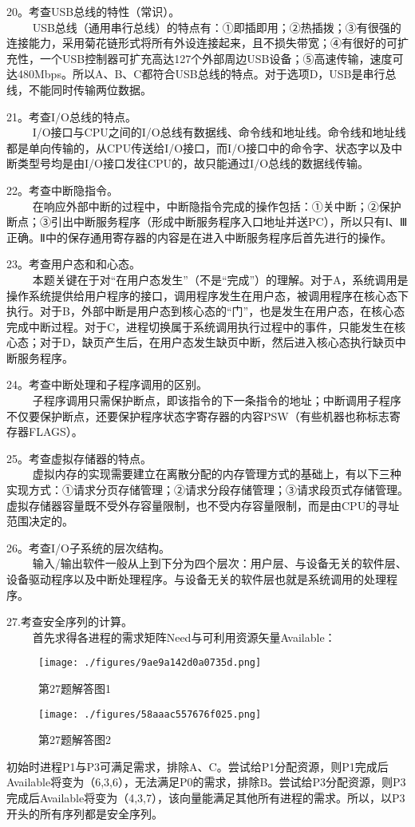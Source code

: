 20。考查USB总线的特性（常识）。\\
$\qquad$ USB总线（通用串行总线）的特点有：①即插即用；②热插拨；③有很强的连接能力，采用菊花链形式将所有外设连接起来，且不损失带宽；④有很好的可扩充性，一个USB控制器可扩充高达127个外部周边USB设备；⑤高速传输，速度可达480Mbps。所以A、B、C都符合USB总线的特点。对于选项D，USB是串行总线，不能同时传输两位数据。

21。考查I/O总线的特点。\\
$\qquad$ I/O接口与CPU之间的I/O总线有数据线、命令线和地址线。命令线和地址线都是单向传输的，从CPU传送给I/O接口，而I/O接口中的命令字、状态字以及中断类型号均是由I/O接口发往CPU的，故只能通过I/O总线的数据线传输。

22。考查中断隐指令。\\
$\qquad$ 在响应外部中断的过程中，中断隐指令完成的操作包括：①关中断；②保护断点；③引出中断服务程序（形成中断服务程序入口地址并送PC），所以只有Ⅰ、Ⅲ正确。Ⅱ中的保存通用寄存器的内容是在进入中断服务程序后首先进行的操作。

23。考查用户态和和心态。\\
$\qquad$ 本题关键在于对“在用户态发生”（不是“完成”）的理解。对于A，系统调用是操作系统提供给用户程序的接口，调用程序发生在用户态，被调用程序在核心态下执行。对于B，外部中断是用户态到核心态的“门”，也是发生在用户态，在核心态完成中断过程。对于C，进程切换属于系统调用执行过程中的事件，只能发生在核心态；对于D，缺页产生后，在用户态发生缺页中断，然后进入核心态执行缺页中断服务程序。

24。考查中断处理和子程序调用的区别。\\
$\qquad$ 子程序调用只需保护断点，即该指令的下一条指令的地址；中断调用子程序不仅要保护断点，还要保护程序状态字寄存器的内容PSW（有些机器也称标志寄存器FLAGS）。

25。考查虚拟存储器的特点。\\
$\qquad$ 虚拟内存的实现需要建立在离散分配的内存管理方式的基础上，有以下三种实现方式：①请求分页存储管理；②请求分段存储管理；③请求段页式存储管理。虚拟存储器容量既不受外存容量限制，也不受内存容量限制，而是由CPU的寻址范围决定的。

26。考查I/O子系统的层次结构。\\
$\qquad$ 输入/输出软件一般从上到下分为四个层次：用户层、与设备无关的软件层、设备驱动程序以及中断处理程序。与设备无关的软件层也就是系统调用的处理程序。

27.考查安全序列的计算。\\
$\qquad$ 首先求得各进程的需求矩阵Need与可利用资源矢量Available：
\begin{figure}[ht]
\centering
\texttt{[image: ./figures/9ae9a142d0a0735d.png]}
\caption{第27题解答图1} \label{fig_CSN12_13}
\end{figure}
\begin{figure}[ht]
\centering
\texttt{[image: ./figures/58aaac557676f025.png]}
\caption{第27题解答图2} \label{fig_CSN12_14}
\end{figure}
初始时进程P1与P3可满足需求，排除A、C。尝试给P1分配资源，则P1完成后Available将变为（6,3,6），无法满足P0的需求，排除B。尝试给P3分配资源，则P3完成后Available将变为（4,3,7），该向量能满足其他所有进程的需求。所以，以P3开头的所有序列都是安全序列。

